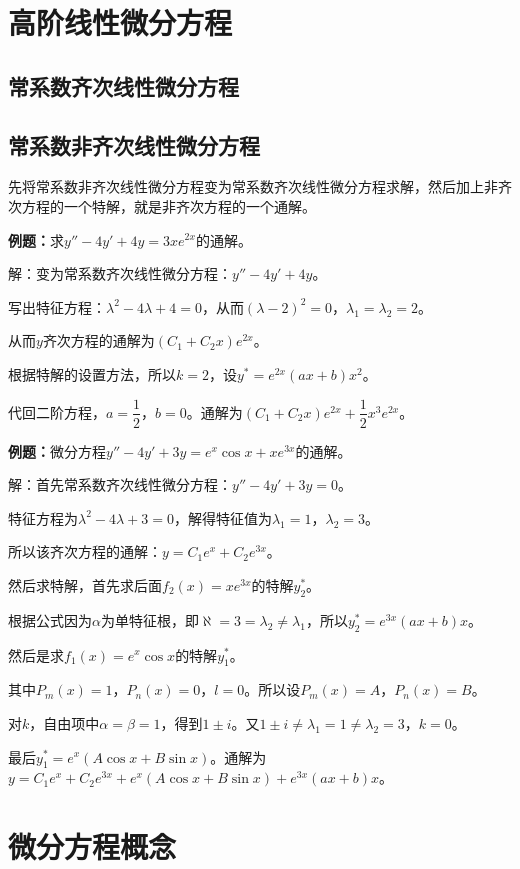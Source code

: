 \documentclass[UTF8, 12pt]{ctexart}
\begin{document}
\section{高阶线性微分方程}

\subsection{常系数齐次线性微分方程}

\subsection{常系数非齐次线性微分方程}

先将常系数非齐次线性微分方程变为常系数齐次线性微分方程求解，然后加上非齐次方程的一个特解，就是非齐次方程的一个通解。

\textbf{例题：}求$y''-4y'+4y=3xe^{2x}$的通解。

解：变为常系数齐次线性微分方程：$y''-4y'+4y$。

写出特征方程：$\lambda^2-4\lambda+4=0$，从而$(\lambda-2)^2=0$，$\lambda_1=\lambda_2=2$。

从而$y$齐次方程的通解为$(C_1+C_2x)e^{2x}$。

根据特解的设置方法，所以$k=2$，设$y^*=e^{2x}(ax+b)x^2$。

代回二阶方程，$a=\dfrac{1}{2}$，$b=0$。通解为$(C_1+C_2x)e^{2x}+\dfrac{1}{2}x^3e^{2x}$。

\textbf{例题：}微分方程$y''-4y'+3y=e^x\cos x+xe^{3x}$的通解。

解：首先常系数齐次线性微分方程：$y''-4y'+3y=0$。

特征方程为$\lambda^2-4\lambda+3=0$，解得特征值为$\lambda_1=1$，$\lambda_2=3$。

所以该齐次方程的通解：$y=C_1e^x+C_2e^{3x}$。

然后求特解，首先求后面$f_2(x)=xe^{3x}$的特解$y_2^*$。

根据公式因为$\alpha$为单特征根，即$\aleph=3=\lambda_2\neq\lambda_1$，所以$y_2^*=e^{3x}(ax+b)x$。

然后是求$f_1(x)=e^x\cos x$的特解$y_1^*$。

其中$P_m(x)=1$，$P_n(x)=0$，$l=0$。所以设$P_m(x)=A$，$P_n(x)=B$。

对$k$，自由项中$\alpha=\beta=1$，得到$1\pm i$。又$1\pm i\neq\lambda_1=1\neq\lambda_2=3$，$k=0$。

最后$y_1^*=e^x(A\cos x+B\sin x)$。通解为$y=C_1e^x+C_2e^{3x}+e^x(A\cos x+B\sin x)+e^{3x}(ax+b)x$。

\section{微分方程概念}
\end{document}
